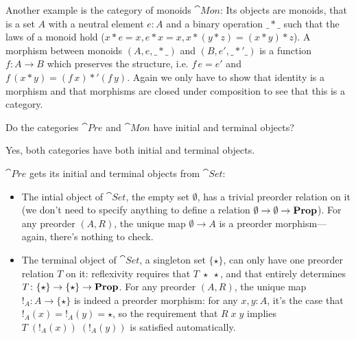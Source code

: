 Another example is the category of monoids $\cat{Mon}$: Its objects are monoids, that is a set $A$ with a neutral element $e:A$ and a binary operation $\_*\_$ such that the laws of a monoid hold ($x*e=x, e*x=x, x*(y*z) = (x*y)*z$). A morphism between monoids $(A,e, \_*\_)$ and $(B,e',\_*'\_)$ is a function $f : A \to B$ which preserves the structure, i.e. $f\,e = e'$ and $f\,(x * y) = (f\,x) *' (f\, y)$. Again we only have to show that identity is a morphism and that morphisms are closed under composition to see that this is a category.

\begin{Exercise}
  Do the categories $\cat{Pre}$ and $\cat{Mon}$ have initial and terminal objects?
\end{Exercise}
\begin{Answer}
  Yes, both categories have both initial and terminal objects. 
  
  $\cat{Pre}$ gets its initial and terminal objects from $\cat{Set}$:
  \begin{itemize}
    \item The intial object of $\cat{Set}$, the empty set $\emptyset$, has a trivial preorder relation on it (we don't need to specify anything to define a relation $\emptyset \to \emptyset \to \mathbf{Prop}$). For any preorder $(A,R)$, the unique map $\emptyset \to A$ is a preorder morphism---again, there's nothing to check.
    \item The terminal object of $\cat{Set}$, a singleton set $\{\star\}$, can only have one preorder relation $T$ on it: reflexivity requires that $T\;\star\;\star$, and that entirely determines $T\colon\{\star\}\to\{\star\}\to\mathbf{Prop}$. For any preorder $(A,R)$, the unique map $!_A\colon A\to\{\star\}$ is indeed a preorder morphism: for any $x,y\colon A$, it's the case that $!_A(x)=!_A(y)=\star$, so the requirement that $R\;x\;y$ implies $T\;(!_A(x))\;(!_A(y))$ is satisfied automatically.
  \end{itemize}


\end{Answer}
